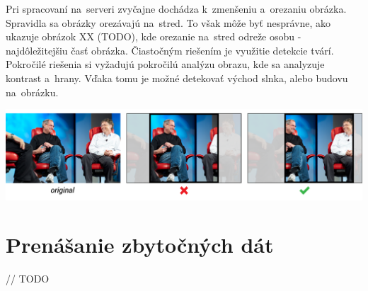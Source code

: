 Pri spracovaní na~serveri zvyčajne dochádza k~zmenšeniu a~orezaniu obrázka. Spravidla sa obrázky orezávajú na~stred. To však môže byť nesprávne, ako ukazuje obrázok XX (TODO), kde orezanie na~stred odreže osobu - najdôležitejšiu časť obrázka. Čiastočným riešením je využitie detekcie tvárí. Pokročilé riešenia si vyžadujú pokročilú analýzu obrazu, kde sa analyzuje kontrast a~hrany. Vďaka tomu je možné detekovať východ slnka, alebo budovu na~obrázku. 

\includegraphics[width=\textwidth]{jobs_gates}

\section{Prenášanie zbytočných dát}

// TODO